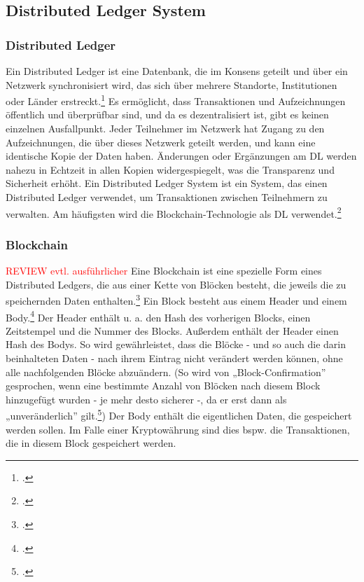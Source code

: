 \noindent

\subsection{Distributed Ledger System}
\label{sec:definition-dls}

\subsubsection{Distributed Ledger}
\label{sec:definition-distributed-ledger}
Ein Distributed Ledger ist eine Datenbank, die im Konsens geteilt und über ein Netzwerk synchronisiert wird, das sich über mehrere Standorte, Institutionen oder Länder erstreckt.\footcite[Vgl. hierzu und im Folgenden][]{w1,w2} 
Es ermöglicht, dass Transaktionen und Aufzeichnungen öffentlich und überprüfbar sind, und da es dezentralisiert ist, gibt es keinen einzelnen Ausfallpunkt. 
Jeder Teilnehmer im Netzwerk hat Zugang zu den Aufzeichnungen, die über dieses Netzwerk geteilt werden, und kann eine identische Kopie der Daten haben. Änderungen oder Ergänzungen am DL werden nahezu in Echtzeit in allen Kopien widergespiegelt, was die Transparenz und Sicherheit erhöht.
\bigbreak
\noindent
Ein Distributed Ledger System ist ein System, das einen Distributed Ledger verwendet, um Transaktionen zwischen Teilnehmern zu verwalten. Am häufigsten wird die Blockchain-Technologie als DL verwendet.\footcite[Vgl.][]{w3}

\subsubsection{Blockchain}
\label{sec:definition-blockchain}
\textcolor{red}{REVIEW evtl. ausführlicher}
Eine Blockchain ist eine spezielle Form eines Distributed Ledgers, die aus einer Kette von Blöcken besteht, die jeweils die zu speichernden Daten enthalten.\footcite[Vgl.][16]{q3} 
Ein Block besteht aus einem Header und einem Body.\footcites[Vgl. hierzu und im Folgenden][S. 161 ff\adddot]{q5}[]{w9}
\bigbreak
\noindent
Der Header enthält u. a. den Hash des vorherigen Blocks, einen Zeitstempel und die Nummer des Blocks.
Außerdem enthält der Header einen Hash des Bodys.
So wird gewährleistet, dass die Blöcke - und so auch die darin beinhalteten Daten - nach ihrem Eintrag nicht verändert werden können, ohne alle nachfolgenden Blöcke abzuändern. 
(So wird von „Block-Confirmation” gesprochen, wenn eine bestimmte Anzahl von Blöcken nach diesem Block hinzugefügt wurden - je mehr desto sicherer -, da er erst dann als „unveränderlich” gilt.\footcites[Vgl.][191]{q5})
\bigbreak
\noindent
Der Body enthält die eigentlichen Daten, die gespeichert werden sollen. Im Falle einer Kryptowährung sind dies bspw. die Transaktionen, die in diesem Block gespeichert werden.

